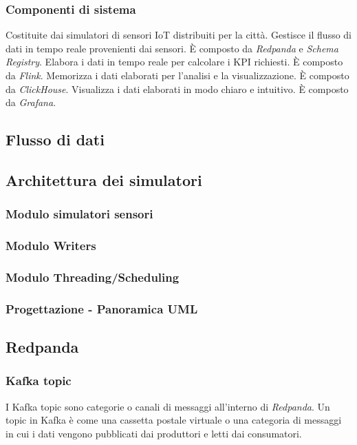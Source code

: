 \subsubsection{Componenti di sistema}
Costituite dai simulatori di sensori IoT distribuiti per la città.
Gestisce il flusso di dati in tempo reale provenienti dai sensori. È composto da \textit{Redpanda} e \textit{Schema Registry}.
Elabora i dati in tempo reale per calcolare i KPI richiesti. È composto da \textit{Flink}.
Memorizza i dati elaborati per l'analisi e la visualizzazione. È composto da \textit{ClickHouse}.
Visualizza i dati elaborati in modo chiaro e intuitivo. È composto da \textit{Grafana}. 

\subsection{Flusso di dati}
\subsection{Architettura dei simulatori}
\subsubsection{Modulo simulatori sensori}
\subsubsection{Modulo Writers}
\subsubsection{Modulo Threading/Scheduling}
\subsubsection{Progettazione - Panoramica UML}
\subsection{Redpanda}
\subsubsection{Kafka topic}
I Kafka topic sono categorie o canali di messaggi all'interno di \textit{Redpanda}. Un topic in Kafka è come una cassetta postale virtuale o una categoria di messaggi in cui i dati vengono pubblicati dai produttori e letti dai consumatori.
